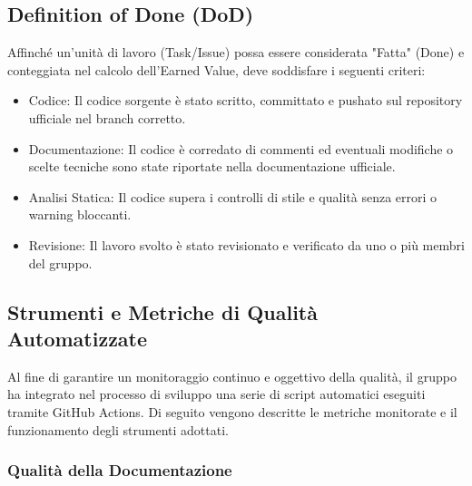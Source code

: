 \documentclass[11pt,a4paper]{article}
\begin{document}
\subsection{Definition of Done (DoD)}
Affinché un'unità di lavoro (Task/Issue) possa essere considerata "Fatta" (Done) e conteggiata nel calcolo dell'Earned Value, deve soddisfare i seguenti criteri:
\begin{itemize} 
    \item Codice: Il codice sorgente è stato scritto, committato e pushato sul repository ufficiale nel branch corretto.
    \item Documentazione: Il codice è corredato di commenti ed eventuali modifiche o scelte tecniche sono state riportate nella documentazione ufficiale.
    \item Analisi Statica: Il codice supera i controlli di stile e qualità senza errori o warning bloccanti. 
    \item Revisione: Il lavoro svolto è stato revisionato e verificato da uno o più membri del gruppo.
\end{itemize}

\subsection{Strumenti e Metriche di Qualità Automatizzate}
Al fine di garantire un monitoraggio continuo e oggettivo della qualità, il gruppo ha integrato nel processo di sviluppo una serie di script automatici eseguiti tramite GitHub Actions. Di seguito vengono descritte le metriche monitorate e il funzionamento degli strumenti adottati.

\subsubsection{Qualità della Documentazione}
\end{document}
